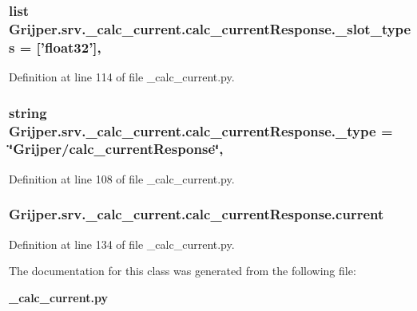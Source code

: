 \subsubsection[{\-\_\-slot\-\_\-types}]{\setlength{\rightskip}{0pt plus 5cm}list Grijper.\-srv.\-\_\-calc\-\_\-current.\-calc\-\_\-current\-Response.\-\_\-slot\-\_\-types = ['float32']\hspace{0.3cm}{\ttfamily [static]}, {\ttfamily [private]}}\label{classGrijper_1_1srv_1_1__calc__current_1_1calc__currentResponse_ab2004471494eaa8dc01a67e3f5150049}


Definition at line 114 of file \-\_\-calc\-\_\-current.\-py.

\subsubsection[{\-\_\-type}]{\setlength{\rightskip}{0pt plus 5cm}string Grijper.\-srv.\-\_\-calc\-\_\-current.\-calc\-\_\-current\-Response.\-\_\-type = \char`\"{}Grijper/{\bf calc\-\_\-current\-Response}\char`\"{}\hspace{0.3cm}{\ttfamily [static]}, {\ttfamily [private]}}\label{classGrijper_1_1srv_1_1__calc__current_1_1calc__currentResponse_a1b2a62ce794a93be8167ae08e4a819bf}


Definition at line 108 of file \-\_\-calc\-\_\-current.\-py.

\subsubsection[{current}]{\setlength{\rightskip}{0pt plus 5cm}Grijper.\-srv.\-\_\-calc\-\_\-current.\-calc\-\_\-current\-Response.\-current}\label{classGrijper_1_1srv_1_1__calc__current_1_1calc__currentResponse_afa395e93610da05e5ca61a2f79b783a9}


Definition at line 134 of file \-\_\-calc\-\_\-current.\-py.



The documentation for this class was generated from the following file\-:\begin{DoxyCompactItemize}
\item 
{\bf \-\_\-calc\-\_\-current.\-py}\end{DoxyCompactItemize}
